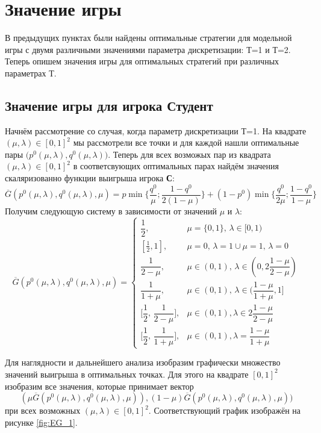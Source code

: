 \section{Значение игры}

В предыдущих пунктах были найдены оптимальные стратегии для 
модельной игры с двумя различными значениями параметра дискретизации:
Т=1 и Т=2. Теперь опишем значения игры для оптимальных стратегий при
различных параметрах Т.

\subsection{Значение игры для игрока Студент}

Начнём рассмотрение со случая, когда параметр дискретизации
Т=1. На квадрате $(\mu, \lambda) \in [0, 1]^2$ мы рассмотрели
все точки и для каждой нашли оптимальные пары 
$\big(p^0(\mu, \lambda), q^0(\mu, \lambda)\big)$.
Теперь для всех возможых пар из квадрата
$(\mu, \lambda) \in [0, 1]^2$ в соответсвующих
оптимальных парах найдём значения скаляризованно функции выигрыша 
игрока \textbf{С}:
$$
	\overline G(p^0(\mu, \lambda), q^0(\mu, \lambda), \mu)=
	p \min \Big\{
		\dfrac{q^0}{\mu};
		\dfrac{1-q^0}{2(1-\mu)}
	\Big\} + (1 - p^0) \min \Big\{
		\dfrac{q^0}{2\mu};
		\dfrac{1 - q^0}{1 - \mu}
	\Big\}
$$
Получим следующую систему в зависимости от значений  $\mu$ и $\lambda$:
$$
	\overline G(p^0(\mu, \lambda), q^0(\mu, \lambda), \mu) =
	\begin{cases}
		\dfrac{1}{2}, & 
		\mu = \{0,1\}, \, \lambda \in [0, 1) 
		\\	
		[\frac{1}{2}, 1], & 
		\mu = 0, \, \lambda = 1 \cup 
		\mu = 1, \, \lambda = 0
		\\
		\dfrac{1}{2-\mu}, &	
		\mu \in (0, 1), \, \lambda \in 
		(0, 2\dfrac{1 - \mu}{2 - \mu})
		\\
		\dfrac{1}{1 + \mu}, & 
		\mu \in (0, 1), \, \lambda \in 
		(\dfrac{1 - \mu}{1 + \mu}, 1]
		\\
		\Big[\dfrac{1}{2}, \, \dfrac{1}{2-\mu}\Big], &
		\mu \in (0, 1), \lambda \in 2\dfrac{1 - \mu}{2 - \mu}
		\\ 
		\Big[\dfrac{1}{2}, \, \dfrac{1}{1+\mu}\Big], &
		\mu \in (0,1), \lambda = \dfrac{1-\mu}{1+\mu}
	\end{cases}
$$

Для наглядности и дальнейшего анализа изобразим графически множество
значений выигрыша в оптимальных точках.
Для этого на квадрате $[0, 1]^{2}$ изобразим все значения, которые 
принимает вектор 
$$
	(\mu \overline G(p^0(\mu, \lambda), q^0(\mu, \lambda), \mu)), 
	(1-\mu) \overline G(p^0(\mu, \lambda), q^0(\mu, \lambda), \mu))
$$ 
при всех возможных $(\mu, \lambda) \in [0, 1]^2$. Соответствующий график
изображён на рисунке \ref{fig:EG_1}.

